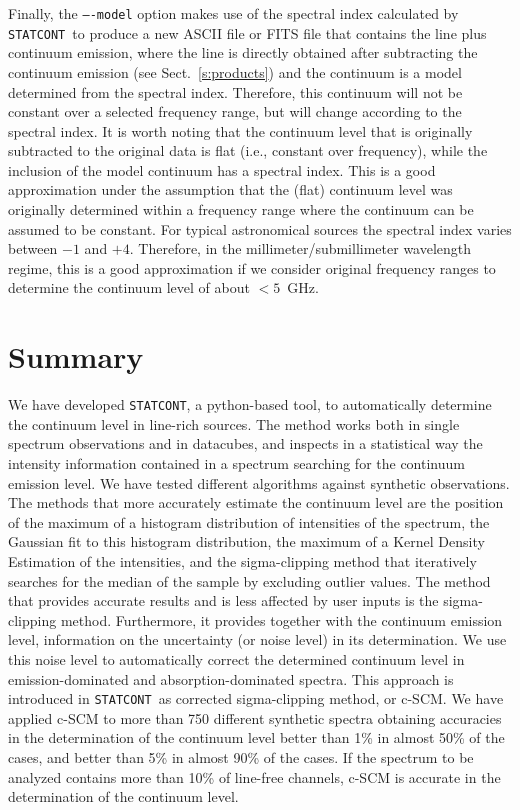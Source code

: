 \documentclass{aa}
\newcommand{\statcont} {\texttt{STATCONT}}
\begin{document}
Finally, the \texttt{----model} option makes use of the spectral index calculated by \statcont\ to produce a new ASCII file or FITS file that contains the line plus continuum emission, where the line is directly obtained after subtracting the continuum emission (see Sect.~\ref{s:products}) and the continuum is a model determined from the spectral index. Therefore, this continuum will not be constant over a selected frequency range, but will change according to the spectral index. It is worth noting that the continuum level that is originally subtracted to the original data is flat (i.e., constant over frequency), while the inclusion of the model continuum has a spectral index. This is a good approximation under the assumption that the (flat) continuum level was originally determined within a frequency range where the continuum can be assumed to be constant. For typical astronomical sources the spectral index varies between $-1$ and $+4$. Therefore, in the millimeter/submillimeter wavelength regime, this is a good approximation if we consider original frequency ranges to determine the continuum level of about $<5$~GHz.

\section{Summary}\label{s:summary}

We have developed \statcont, a python-based tool, to automatically determine the continuum level in line-rich sources. The method works both in single spectrum observations and in datacubes, and inspects in a statistical way the intensity information contained in a spectrum searching for the continuum emission level. We have tested different algorithms against synthetic observations. The methods that more accurately estimate the continuum level are the position of the maximum of a histogram distribution of intensities of the spectrum, the Gaussian fit to this histogram distribution, the maximum of a Kernel Density Estimation of the intensities, and the sigma-clipping method that iteratively searches for the median of the sample by excluding outlier values. The method that provides accurate results and is less affected by user inputs is the sigma-clipping method. Furthermore, it provides together with the continuum emission level, information on the uncertainty (or noise level) in its determination. We use this noise level to automatically correct the determined continuum level in emission-dominated and absorption-dominated spectra. This approach is introduced in \statcont\ as corrected sigma-clipping method, or c-SCM. We have applied c-SCM to more than 750 different synthetic spectra obtaining accuracies in the determination of the continuum level better than 1\% in almost 50\% of the cases, and better than 5\% in almost 90\% of the cases. If the spectrum to be analyzed contains more than 10\% of line-free channels, c-SCM is accurate in the determination of the continuum level.
\end{document}
